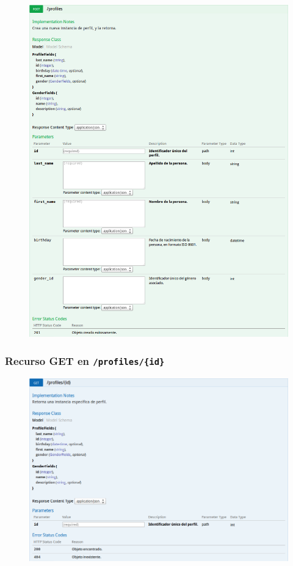 \begin{figure}[h]
  \centering
  \includegraphics[width=\textwidth,height=.75\textheight,keepaspectratio]{img/especificacion_api/profileList_post}
  \label{profileList_post}
\end{figure}

\newpage


\subsubsection{Recurso GET en \texttt{/profiles/\{id\}}}

\begin{figure}[h]
  \centering
  \includegraphics[width=\textwidth,height=.75\textheight,keepaspectratio]{img/especificacion_api/profileView_get}
  \label{profileView_get}
\end{figure}

